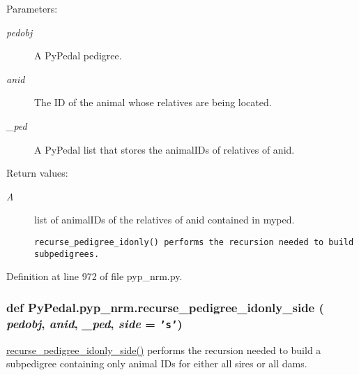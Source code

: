 \begin{Desc}
\item[Parameters:]
\begin{description}
\item[{\em pedobj}]A Py\-Pedal pedigree. \item[{\em anid}]The ID of the animal whose relatives are being located. \item[{\em \_\-ped}]A Py\-Pedal list that stores the animal\-IDs of relatives of anid. \end{description}
\end{Desc}
\begin{Desc}
\item[Return values:]
\begin{description}
\item[{\em A}]list of animal\-IDs of the relatives of anid contained in myped.

\footnotesize\begin{verbatim}recurse_pedigree_idonly() performs the recursion needed to build subpedigrees.
\end{verbatim}
\normalsize
 \end{description}
\end{Desc}


Definition at line 972 of file pyp\_\-nrm.py.\hypertarget{namespacePyPedal_1_1pyp__nrm_88b1e0971e11743e8b521ef227e29e6f}{
\subsubsection[recurse\_\-pedigree\_\-idonly\_\-side]{\setlength{\rightskip}{0pt plus 5cm}def Py\-Pedal.pyp\_\-nrm.recurse\_\-pedigree\_\-idonly\_\-side ( {\em pedobj},  {\em anid},  {\em \_\-ped},  {\em side} = {\tt 's'})}}
\label{namespacePyPedal_1_1pyp__nrm_88b1e0971e11743e8b521ef227e29e6f}


\hyperlink{namespacePyPedal_1_1pyp__nrm_88b1e0971e11743e8b521ef227e29e6f}{recurse\_\-pedigree\_\-idonly\_\-side()} performs the recursion needed to build a subpedigree containing only animal IDs for either all sires or all dams. 

